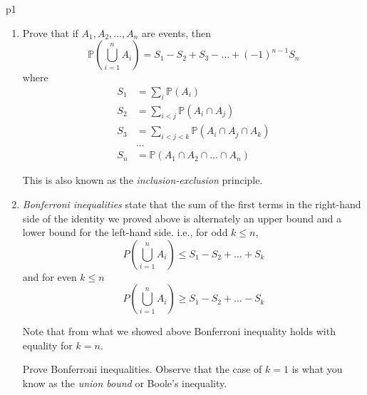\documentclass[a4paper, 11pt]{article}
\begin{document}
\begin{problem}{%
	}{p1%
}
\begin{enumerate}[label=(\alph*)]
	\item Prove that if $A_1, A_2, \ldots, A_n$ are events, then
	$$
	\mathbb{P}\left(\bigcup_{i=1}^n A_i\right)=S_1-S_2+S_3-\ldots+(-1)^{n-1} S_n
	$$
	where
	$$
	\begin{aligned}
		S_1 & =\sum_i \mathbb{P}\left(A_i\right) \\
		S_2 & =\sum_{i<j} \mathbb{P}\left(A_i \cap A_j\right) \\
		S_3 & =\sum_{i<j<k} \mathbb{P}\left(A_i \cap A_j \cap A_k\right) \\
		& \ldots \\
		S_n & =\mathbb{P}\left(A_1 \cap A_2 \cap \ldots \cap A_n\right)
	\end{aligned}
	$$
	
	This is also known as the \textit{inclusion-exclusion} principle.
	\item  \textit{Bonferroni inequalities} state that the sum of the first terms in the right-hand side of the identity we proved above is alternately an upper bound and a lower bound for the left-hand side. i.e., for odd $k \leq n$,
	$$
	P\left(\bigcup_{i=1}^n A_i\right) \leq S_1-S_2+\ldots+S_k
	$$
	and for even $k \leq n$
	$$
	P\left(\bigcup_{i=1}^n A_i\right) \geq S_1-S_2+\ldots-S_k
	$$
	
	Note that from what we showed above Bonferroni inequality holds with equality for $k=n$.
	
	Prove Bonferroni inequalities. Observe that the case of $k=1$ is what you know as the \textit{union bound} or Boole's inequality.
\end{enumerate}
\end{problem}
\end{document}
